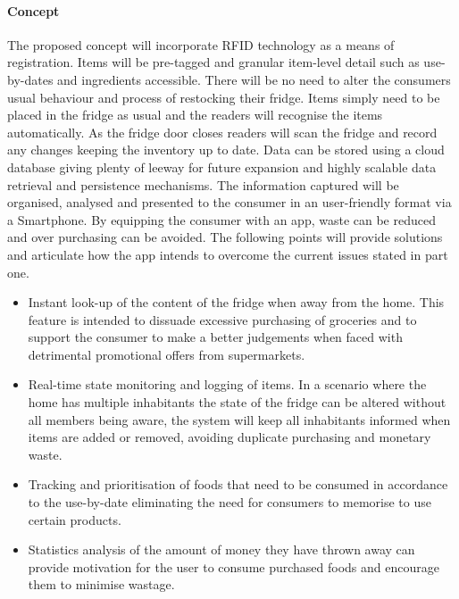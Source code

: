 \documentclass[a4paper, 11pt]{article}
\begin{document}
{\paragraph{Concept}The proposed concept will incorporate RFID technology as a means of registration. Items will be pre-tagged and granular item-level detail such as use-by-dates and ingredients accessible. There will be no need to alter the consumers usual behaviour and process of restocking their fridge. Items simply need to be placed in the fridge as usual and the readers will recognise the items automatically. As the fridge door closes readers will scan the fridge and record any changes keeping the inventory up to date. Data can be stored using a cloud database giving plenty of leeway for future expansion and highly scalable data retrieval and persistence mechanisms. The information captured will be organised, analysed and presented to the consumer in an user-friendly format via a Smartphone. By equipping the consumer with an app, waste can be reduced and over purchasing can be avoided. The following points will provide solutions and articulate how the app intends to overcome the current issues stated in part one.

\vspace{\baselineskip}

\begin{itemize}
  \item Instant look-up of the content of the fridge when away from the home. This feature is intended to dissuade excessive purchasing of groceries and to support the consumer to make a better judgements when faced with detrimental promotional offers from supermarkets.
  
  \item Real-time state monitoring and logging of items. In a scenario where the home has multiple inhabitants the state of the fridge can be altered without all members being aware, the system will keep all inhabitants informed when items are added or removed, avoiding duplicate purchasing and monetary waste.
  
  \item Tracking and prioritisation of foods that need to be consumed in accordance to the use-by-date eliminating the need for consumers to memorise to use certain products. 
  
  \item Statistics analysis of the amount of money they have thrown away can provide motivation for the user to consume purchased foods and encourage them to minimise wastage.
   

\end{itemize}}
\end{document}
